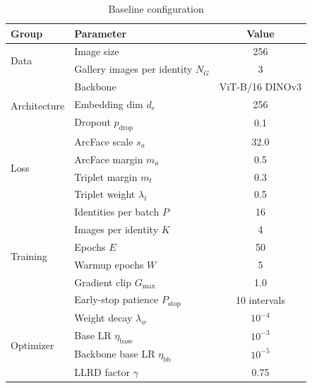 \documentclass[conference]{IEEEtran}
\begin{document}
\begin{table}[t]
  \caption{Baseline configuration}
  \label{tab:baseline_cfg}
  \centering
  \footnotesize
  \begin{tabular}{@{}llc@{}}
    \toprule
    \textbf{Group} & \textbf{Parameter}                    & \textbf{Value}  \\
    \midrule
    \multirow{2}{*}{Data}
                   & Image size                            & 256             \\
                   & Gallery images per identity $N_G$     & 3               \\
    \midrule
    \multirow{3}{*}{Architecture}
                   & Backbone                              & ViT-B/16 DINOv3 \\
                   & Embedding dim $d_e$                   & 256             \\
                   & Dropout $p_{\text{drop}}$             & 0.1             \\
    \midrule
    \multirow{4}{*}{Loss}
                   & ArcFace scale $s_a$                   & 32.0            \\
                   & ArcFace margin $m_a$                  & 0.5             \\
                   & Triplet margin $m_t$                  & 0.3             \\
                   & Triplet weight $\lambda_t$            & 0.5             \\
    \midrule
    \multirow{6}{*}{Training}
                   & Identities per batch $P$              & 16              \\
                   & Images per identity $K$               & 4               \\
                   & Epochs $E$                            & 50              \\
                   & Warmup epochs $W$                     & 5               \\
                   & Gradient clip $G_{\max}$              & 1.0             \\
                   & Early-stop patience $P_{\text{stop}}$ & 10 intervals    \\
    \midrule
    \multirow{4}{*}{Optimizer}
                   & Weight decay $\lambda_w$              & $10^{-4}$       \\
                   & Base LR $\eta_{\text{base}}$          & $10^{-3}$       \\
                   & Backbone base LR $\eta_{\text{bb}}$   & $10^{-5}$       \\
                   & LLRD factor $\gamma$                  & 0.75            \\
    \bottomrule
  \end{tabular}
\end{table}
\end{document}
